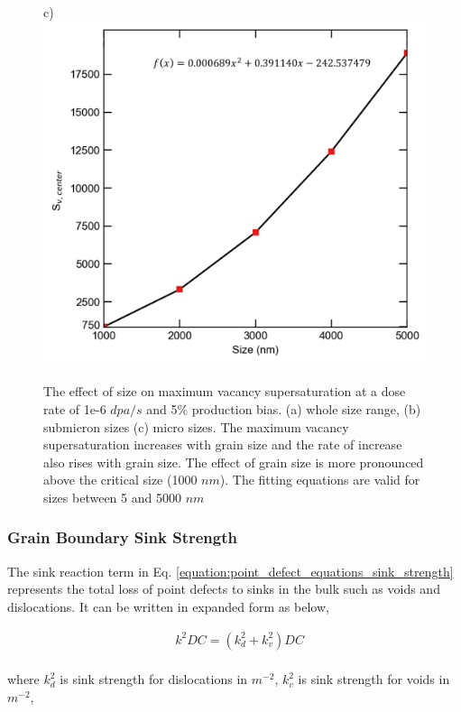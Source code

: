\documentclass[utf8]{frontiersSCNS} %
\begin{document}
\begin{figure}[h!]
        c)\includegraphics[scale=0.55]{Fig8_c}
        \caption{The effect of size on maximum vacancy supersaturation at a dose rate of 1e-6 $dpa/s$ and 5\% production bias. (a) whole size range, (b) submicron sizes (c) micro sizes. The maximum vacancy supersaturation increases with grain size and the rate of increase also rises with grain size. The effect of grain size is more pronounced above the critical size (1000 $nm$). The fitting equations are valid for sizes between 5 and 5000 $nm$}
        \label{figure:center_vacancy_supersaturation_neutron}
    \end{figure}
\newpage
\subsubsection{Grain Boundary Sink Strength}
    The sink reaction term in Eq. \ref{equation:point_defect_equations_sink_strength} represents the total loss of point defects to sinks in the bulk such as voids and dislocations. It can be written in expanded form as below,

    \begin{equation}
      \begin{aligned}
        &k^2DC=(k_d^2 + k_v^2)DC
      \end{aligned}
    \end{equation}\\
    where ${k_d^2}$ is sink strength for dislocations in $m^{-2}$, $ {k_v^2}$ is sink strength for voids in ${m^{-2}}$,
    
\end{document}
